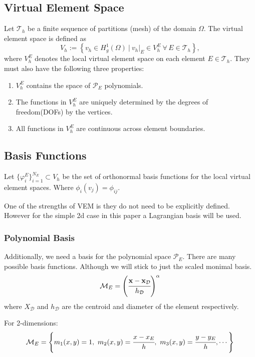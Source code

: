 \documentclass[class=article, crop=false]{standalone}
\begin{document}
\subsection{Virtual Element Space}
Let $\mathcal{T}_h$ be a finite sequence of partitions (mesh) of the domain $\Omega$. The virtual element space is defined as
$$
V_h := \left\{ v_h \in H^1_g(\Omega) \ \bigg| \ v_h|_E \in V_h^E \ \forall \, E \in \mathcal{T}_h \right\},
$$
where $V_h^E$ denotes the local virtual element space on each element $E \in \mathcal{T}_h$. They must also have the following three properties:
\begin{enumerate}
    \item $V^E_h$ contains the space of $\mathcal{P}_E$ polynomials.

    \item The functions in $V^E_h$ are uniquely determined by the degrees of freedom(DOFs) by the vertices. %

    \item All functions in $V^E_h$ are continuous across element boundaries.
\end{enumerate}
\cite{sutton2017virtual}


\subsection{Basis Functions}
Let $\{\varphi_i^E\}_{i=1}^{N_E} \subset V_h$ be the set of orthonormal basis functions for the local virtual element spaces. Where $\phi_i(v_j) = \phi_{ij}.$

One of the strengths of VEM is they do not need to be explicitly defined. However for the simple 2d case in this paper a Lagrangian basis will be used.

\subsubsection{Polynomial Basis}
Additionally, we need a basis for the polynomial space $\mathcal{P}_E$. There are many possible basis functions. Although we will stick to just the scaled monimal basis.
\begin{equation}
    \mathcal{M}_E = \left(\cfrac{\mathbf{x} - \mathbf{x}_{\mathcal{D}}}{h_{\mathcal{D}}}\right)^{\alpha}
\end{equation}
where $X_{\mathcal{D}}$ and $h_{\mathcal{D}}$ are the centroid and diameter of the element respectively.

For 2-dimensions:
\begin{equation}
    \mathcal{M}_E = \left\{m_1(x,y) = 1,\ m_2(x,y) = \cfrac{x-x_E}{h},\ m_3(x,y) = \cfrac{y-y_E}{h}, \cdots\right\}
\end{equation}
\end{document}
